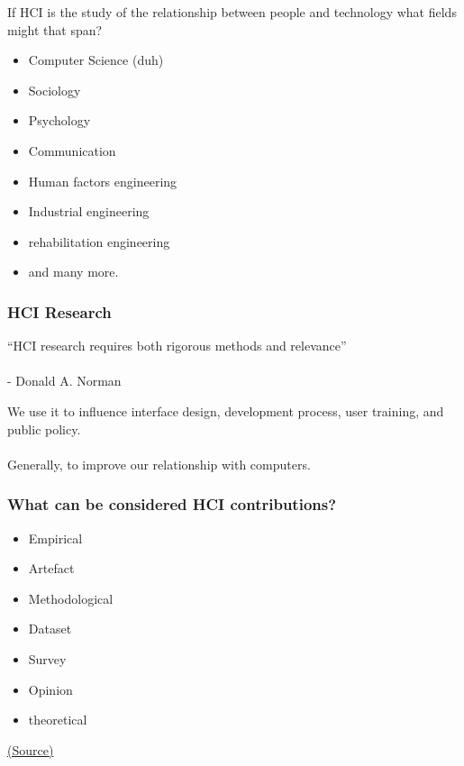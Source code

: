 \begin{frame}
	\begin{center}
		If HCI is the study of the relationship between people and technology what fields might that span?
	\end{center}
	\pause
	\begin{itemize}
		\item Computer Science (duh)
		\item Sociology
		\item Psychology
		\item Communication
		\item Human factors engineering
		\item Industrial engineering
		\item rehabilitation engineering
		\item and many more.
	\end{itemize}	
\end{frame}

\begin{frame}
	\frametitle{HCI Research}
	\begin{displayquote}	
		``HCI research requires both rigorous methods and relevance'' \\ ~ \\ - Donald A. Norman
	\end{displayquote} 
	\pause
	
	
	We use it to influence interface design, development process, user training, and public policy. \\ ~ \\
	Generally, to improve our relationship with computers.

\end{frame}

\begin{frame}
		
	\frametitle{What can be considered HCI contributions?}

	\begin{itemize}
		\item Empirical
		\item Artefact
		\item Methodological
		\item Dataset
		\item Survey	
		\item Opinion
		\item theoretical
	\end{itemize}

	\href{http://interactions.acm.org/archive/view/may-june-2016/research-contribution-in-human-computer-interaction}{(Source)} 
\end{frame}

